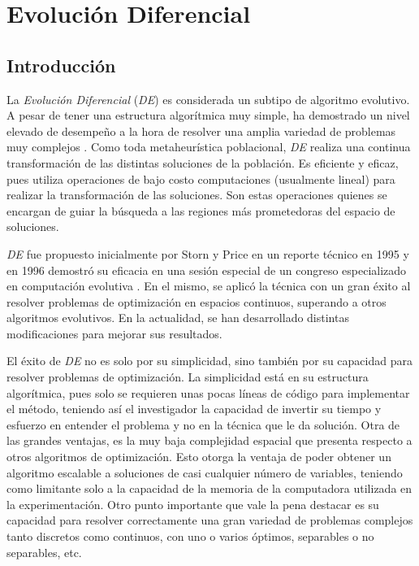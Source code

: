 \chapter{Evolución Diferencial}
\label{sec:DE}

\section{Introducción}


La \textit{Evolución Diferencial} (\textit{DE}) es considerada un subtipo de algoritmo evolutivo. A pesar de tener una estructura algorítmica muy simple, ha demostrado un nivel elevado de desempeño a la hora de resolver una amplia variedad de problemas muy complejos \cite{PriceStornLampinen}. Como toda metaheurística poblacional, \textit{DE} realiza una continua transformación de las distintas soluciones de la población. Es eficiente y eficaz, pues utiliza operaciones de bajo costo computaciones (usualmente lineal) para realizar la transformación de las soluciones. Son estas operaciones quienes se encargan de guiar la búsqueda a las regiones más prometedoras del espacio de soluciones.


\textit{DE} fue propuesto inicialmente por Storn y Price en un reporte técnico en 1995 \cite{StornPrice} y en 1996 demostró su eficacia en una sesión especial de un congreso especializado en computación evolutiva \cite{StornPriceConference}. En el mismo, se aplicó la técnica con un gran éxito al resolver problemas de optimización en espacios continuos, superando a otros algoritmos evolutivos. En la actualidad, se han desarrollado distintas modificaciones para mejorar sus resultados.


El éxito de \textit{DE} no es solo por su simplicidad, sino también por su capacidad para resolver problemas de optimización. La simplicidad está en su estructura algorítmica, pues solo se requieren unas pocas líneas de código para implementar el método, teniendo así el investigador la capacidad de invertir su tiempo y esfuerzo en entender el problema y no en la técnica que le da solución. Otra de las grandes ventajas, es la muy baja complejidad espacial que presenta respecto a otros algoritmos de optimización. Esto otorga la ventaja de poder obtener un algoritmo escalable a soluciones de casi cualquier número de variables, teniendo como limitante solo a la capacidad de la memoria de la computadora utilizada en la experimentación. Otro punto importante que vale la pena destacar es su capacidad para resolver correctamente una gran variedad de problemas complejos tanto discretos como continuos, con uno o varios óptimos, separables o no separables, etc.


